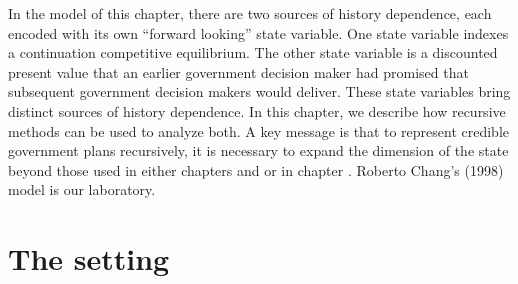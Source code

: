 %
%
%
%
In the model of this chapter, there are two sources of history dependence, each encoded with its own ``forward looking'' state variable.  One state variable
indexes  a continuation competitive equilibrium. The other state variable is a discounted present value that an earlier government decision maker had
promised that  subsequent government decision makers would deliver. These state variables bring   distinct  sources of history dependence.  In this chapter, we describe how recursive methods can be used to analyze both. A key message  is that to represent credible government plans recursively, it is necessary
 to expand the dimension of the state beyond those used in either chapters  and    or in chapter .
  Roberto Chang's (1998) model is our laboratory.

\section{The setting}

